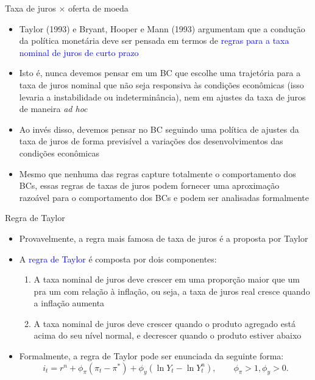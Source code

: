 \documentclass[10pt]{beamer}
\begin{document}
\begin{frame}{Taxa de juros $\times$ oferta de moeda}
    \begin{itemize}
        \item Taylor (1993) e Bryant, Hooper e Mann (1993) argumentam que a condução da política monetária deve ser pensada em termos de \textcolor{blue}{regras para a taxa nominal de juros de curto prazo}
        \bigskip
        \item Isto é, nunca devemos pensar em um BC que escolhe uma trajetória para a taxa de juros nominal que não seja responsiva às condições econômicas (isso levaria a instabilidade ou indeterminância), nem em ajustes da taxa de juros de maneira \emph{ad hoc}
        \bigskip
        \item Ao invés disso, devemos pensar no BC seguindo uma política de ajustes da taxa de juros de forma previsível a variações dos desenvolvimentos das condições econômicas
        \bigskip
        \item Mesmo que nenhuma das regras capture totalmente o comportamento dos BCs, essas regras de taxas de juros podem fornecer uma aproximação razoável para o comportamento dos BCs e podem ser analisadas formalmente
    \end{itemize}
\end{frame}

\begin{frame}{Regra de Taylor}
    \begin{itemize}
        \item Provavelmente, a regra mais famosa de taxa de juros é a proposta por Taylor
        \bigskip
        \item A \textcolor{blue}{regra de Taylor} é composta por dois componentes:
        \bigskip
        \begin{enumerate}
            \item A taxa nominal de juros deve crescer em uma proporção maior que um pra um com relação à inflação, ou seja, a taxa de juros real cresce quando a inflação aumenta
            \medskip
            \item A taxa nominal de juros deve crescer quando o produto agregado está acima do seu nível normal, e decrescer quando o produto estiver abaixo
        \end{enumerate}
        \bigskip
        \item Formalmente, a regra de Taylor pode ser enunciada da seguinte forma:
        \begin{equation}
            i_t = r^n + \phi_\pi (\pi_t -\pi^*) + \phi_y\left(\ln Y_t - \ln Y_t^n\right), \qquad \phi_\pi>1, \phi_y>0.
            \label{ap1}
        \end{equation}
    \end{itemize}
\end{frame}
\end{document}
